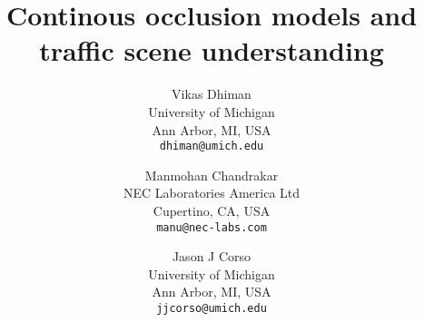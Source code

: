 \documentclass[10pt,twocolumn,letterpaper]{article}
\begin{document}
\title{Continous occlusion models and traffic scene understanding}
\author{Vikas Dhiman\\
  University of Michigan\\
  Ann Arbor, MI, USA\\
  {\tt\small dhiman@umich.edu}
  \and
  Manmohan Chandrakar\\
  NEC Laboratories America Ltd\\
  Cupertino, CA, USA\\
  {\tt\small manu@nec-labs.com}
  \and
  Jason J Corso\\
  University of Michigan\\
  Ann Arbor, MI, USA\\
  {\tt\small jjcorso@umich.edu}
}
\maketitle





% 








%




%
%

%

% 


{\small
  
  
}
\end{document}
